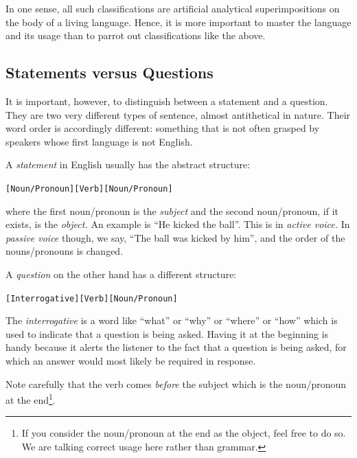 \documentclass[
  a4paper,
]{article}
\newcommand\noun[1]{\textcolor{noun}{#1}}
\newcommand\pronoun[1]{\textcolor{pronoun}{#1}}
\newcommand\action[1]{\textcolor{action}{#1}}
\begin{document}
In one sense, all such classifications are artificial analytical
superimpositions on the body of a living language. Hence, it is more
important to master the language and its usage than to parrot out
classifications like the above.

\hypertarget{statements-versus-questions}{%
\subsection{Statements versus
Questions}\label{statements-versus-questions}}

It is important, however, to distinguish between a statement and a
question. They are two very different types of sentence, almost
antithetical in nature. Their word order is accordingly different:
something that is not often grasped by speakers whose first language is
not English.

A \emph{statement} in English usually has the abstract structure:

\begin{tcolorbox}
\begin{alltt}
\color{normal}
[\noun{Noun}/\pronoun{Pronoun}] [\action{Verb}] [\noun{Noun}/\pronoun{Pronoun}]
\end{alltt}
\end{tcolorbox}

where the first noun/pronoun is the \emph{subject} and the second
noun/pronoun, if it exists, is the \emph{object.} An example is ``He
kicked the ball''. This is in \emph{active voice.} In \emph{passive
voice} though, we say, ``The ball was kicked by him'', and the order of
the nouns/pronouns is changed.

A \emph{question} on the other hand has a different structure:

\begin{tcolorbox}
\begin{alltt}
\color{normal}
[Interrogative] [\action{Verb}] [\noun{Noun}/\pronoun{Pronoun}]
\end{alltt}
\end{tcolorbox}

The \emph{interrogative} is a word like ``what'' or ``why'' or ``where''
or ``how'' which is used to indicate that a question is being asked.
Having it at the beginning is handy because it alerts the listener to
the fact that a question is being asked, for which an answer would most
likely be required in response.

Note carefully that the verb comes \emph{before} the subject which is
the noun/pronoun at the end\footnote{If you consider the noun/pronoun at
  the end as the object, feel free to do so. We are talking correct
  usage here rather than grammar.}.
\end{document}
